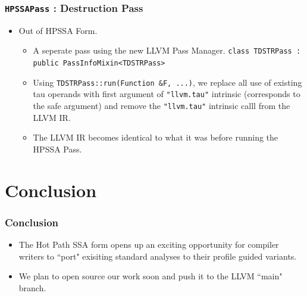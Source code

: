 \documentclass[aspectratio=169, compress]{beamer}
\begin{document}
\begin{frame}
	\frametitle{\texttt{HPSSAPass} : Destruction Pass}
	\begin{itemize}
		\item Out of HPSSA Form. 
		\begin{itemize}
			\item A seperate pass using the new LLVM Pass Manager. \texttt{class TDSTRPass : public PassInfoMixin<TDSTRPass>} \pause
			\item Using \texttt{TDSTRPass::run(Function &F, ...)}, we replace all use of existing tau operands with first argument of  \texttt{"llvm.tau"} intrinsic (corresponds to the safe argument) and remove the \texttt{"llvm.tau"} intrinsic calll from the LLVM IR.
			\item The LLVM IR becomes identical to what it was before running the HPSSA Pass. \pause
		\end{itemize}
	\end{itemize}
\begin{figure}[]
	\centering
	\begin{minipage}{0.4\textwidth}
		\centering
	\end{minipage}
	\begin{minipage}{0.4\textwidth}
		\centering
	\end{minipage}
\end{figure}

\end{frame}

\footnotesize

\section{Conclusion}
\begin{frame}
	\frametitle{Conclusion}
	\begin{itemize}
		\item The Hot Path SSA form opens up an exciting opportunity for compiler writers to ``port" exisiting standard analyses to their profile guided variants. \pause
		\item We plan to open source our work soon and push it to the LLVM ``main" branch.
	\end{itemize}
\end{frame}
\end{document}
